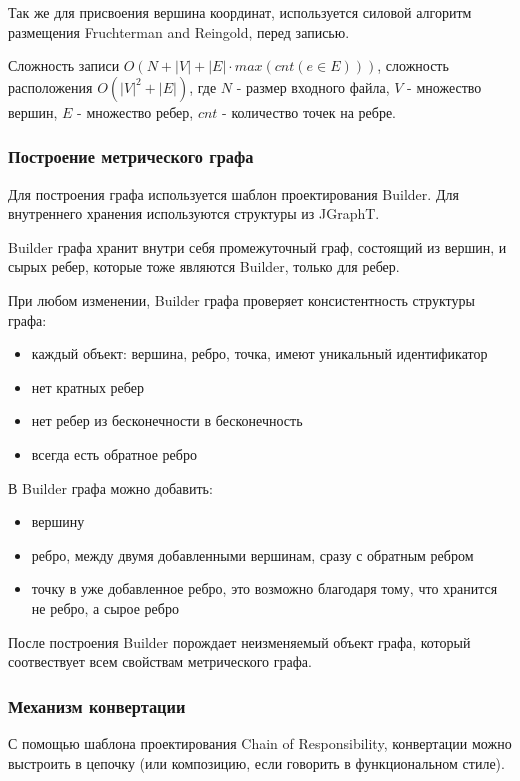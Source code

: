 \documentclass{../TechDoc}
\begin{document}
		Так же для присвоения вершина координат, используется силовой алгоритм размещения Fruchterman and Reingold, перед записью.
		
		Сложность записи $O(N + |V| + |E| \cdot max(cnt(e \in E)))$, сложность расположения $O(|V|^2 + |E|)$, где $N$ - размер входного файла, $V$ - множество вершин, $E$ - множество ребер, $cnt$ - количество точек на ребре.
		
	\subsubsection{Построение метрического графа}
		Для построения графа используется шаблон проектирования Builder\cite{builder}. Для внутреннего хранения используются структуры из JGraphT\cite{jgrapht}.
		
		Builder графа хранит внутри себя промежуточный граф, состоящий из вершин, и сырых ребер, которые тоже являются Builder, только для ребер.
		
		При любом изменении, Builder графа проверяет консистентность структуры графа:
		\begin{itemize}
			\item каждый объект: вершина, ребро, точка, имеют уникальный идентификатор
			\item нет кратных ребер
			\item нет ребер из бесконечности в бесконечность
			\item всегда есть обратное ребро
		\end{itemize}
		
		В Builder графа можно добавить:
		\begin{itemize}
			\item вершину
			\item ребро, между двумя добавленными вершинам, сразу с обратным ребром
			\item точку в уже добавленное ребро, это возможно благодаря тому, что хранится не ребро, а сырое ребро
		\end{itemize}
	
		После построения Builder порождает неизменяемый объект графа, который соотвествует всем свойствам метрического графа.
		
	\subsubsection{Механизм конвертации}
		С помощью шаблона проектирования Chain of Responsibility\cite{chain_resp}, конвертации можно выстроить в цепочку (или композицию, если говорить в функциональном стиле). 
		
\end{document}
